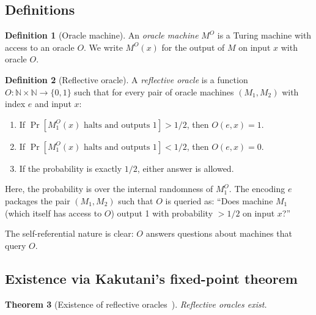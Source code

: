 \documentclass[11pt,a4paper]{article}
\newtheorem{theorem}{Theorem}[section]
\theoremstyle{definition}
\newtheorem{definition}[theorem]{Definition}
\theoremstyle{remark}
\newcommand{\N}{\mathbb{N}}
\begin{document}
\subsection{Definitions}

\begin{definition}[Oracle machine]
An \emph{oracle machine} $M^O$ is a Turing machine with access to an
oracle $O$.  We write $M^O(x)$ for the output of $M$ on input $x$
with oracle $O$.
\end{definition}

\begin{definition}[Reflective oracle]\label{def:reflective-oracle}
A \emph{reflective oracle} is a function
$O : \N \times \N \to \{0, 1\}$ such that for every pair of oracle
machines $(M_1, M_2)$ with index $e$ and input $x$:
\begin{enumerate}[label=(\roman*)]
  \item If $\Pr[M_1^O(x) \text{ halts and outputs } 1] > 1/2$,
    then $O(e, x) = 1$.
  \item If $\Pr[M_1^O(x) \text{ halts and outputs } 1] < 1/2$,
    then $O(e, x) = 0$.
  \item If the probability is exactly $1/2$, either answer is allowed.
\end{enumerate}
Here, the probability is over the internal randomness of $M_1^O$.  The
encoding $e$ packages the pair $(M_1, M_2)$ such that $O$ is queried
as: ``Does machine $M_1$ (which itself has access to $O$) output 1 with
probability $> 1/2$ on input $x$?''
\end{definition}

The self-referential nature is clear: $O$ answers questions about
machines that query $O$.

\subsection{Existence via Kakutani's fixed-point theorem}

\begin{theorem}[Existence of reflective oracles~\cite{fallenstein2015reflective}]
Reflective oracles exist.
\end{theorem}
\end{document}
